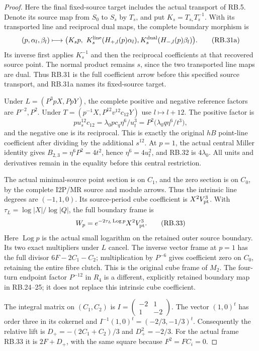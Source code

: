 \begin{proof}
Here the final fixed-source target includes the actual transport
of RB.5. Denote its source map from \(S_0\) to \(S_s\) by
\(T_s\), and put \(K_s=T_{s_*}T_s^{-1}\). With its transported
line and reciprocal dual maps, the complete boundary morphism is
\[
 (p,\alpha_l,\beta_l)\longmapsto
 \bigl(K_s p,\ K_s^{\rm line}(H_{+,l}(p)\alpha_l),
                 K_s^{\rm dual}(H_{-,l}(p)\beta_l)\bigr).
 \tag{RB.31a}
\]
Its inverse first applies \(K_s^{-1}\) and then the reciprocal
coefficients at that recovered source point. The normal product
remains \(s\), since the two transported line maps are dual.
Thus RB.31 is the full coefficient arrow before this specified
source transport, and RB.31a names its fixed-source target.

Under \(L=(P^3pX,PpY)\), the complete positive and negative
reference factors are \(P^{-2},P^2\). Under
\(T=(p^{-1}X,P^{12}v^{12}c_{12}Y)\) use \(l\mapsto l+12\).
The positive factor is
\[
 p u_s^{12}c_{12}
   =\lambda_0p c_q\eta^6/u_t^3
   =P^2\bigl(\lambda_0q\eta^6/t^3\bigr),
 \tag{RB.32}
\]
and the negative one is its reciprocal. This is exactly the
original \(hB\) point-line coefficient after dividing by the
additional \(s^{12}\). At \(p=1\), the actual central Miller
identity gives \(B_{2,3}=\eta^6P^2=4t^2\), hence
\(\eta^6=4u_t^2\), and RB.32 is \(4\lambda_0\).
All units and derivatives remain in the equality before this
central restriction.

The actual minimal-source point section is on \(C_1\), and
the zero section is on \(C_0\), by the complete I2P/MR source
and module arrows. Thus the intrinsic line degrees are
\((-1,1,0)\). Its source-period cube coefficient is
\(X^2V_{\rm pt}^3\). With
\(\tau_L=\log|X|/\log|Q|\), the full boundary frame is
\[
 W_p=e^{-2\tau_L\operatorname{Log}p}X^2V_{\rm pt}^3.
 \tag{RB.33}
\]
Here \(\operatorname{Log}p\) is the actual small logarithm on
the retained outer source boundary. Its two exact multipliers
under \(L\) cancel. The inverse vector frame at \(p=1\) has
the full divisor \(6F-2C_1-C_2\); multiplication by \(P^{-6}\)
gives coefficient zero on \(C_0\), retaining the entire fibre
clutch. This is the original cube frame of \(M_2\). The
four-turn endpoint factor \(P^{-12}\) in \(R_4\) is a
different, explicitly retained boundary map in RB.24--25; it
does not replace this intrinsic cube coefficient.

The integral matrix on \((C_1,C_2)\) is
\(I=\left(\begin{smallmatrix}-2&1\\1&-2\end{smallmatrix}\right)\).
The vector \((1,0)^t\) has order three in its cokernel and
\(I^{-1}(1,0)^t=(-2/3,-1/3)^t\). Consequently the relative
lift is \(D_+=-(2C_1+C_2)/3\) and \(D_+^2=-2/3\).
For the actual frame RB.33 it is \(2F+D_+\), with the same
square because \(F^2=FC_i=0\).


\end{proof}
